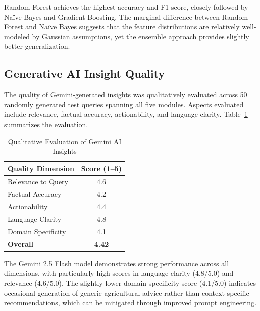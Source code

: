 Random Forest achieves the highest accuracy and F1-score, closely followed by Na\"ive Bayes and Gradient Boosting. The marginal difference between Random Forest and Na\"ive Bayes suggests that the feature distributions are relatively well-modeled by Gaussian assumptions, yet the ensemble approach provides slightly better generalization.

\subsection{Generative AI Insight Quality}
The quality of Gemini-generated insights was qualitatively evaluated across 50 randomly generated test queries spanning all five modules. Aspects evaluated include relevance, factual accuracy, actionability, and language clarity. Table~\ref{tab:gemini_eval} summarizes the evaluation.

\begin{table}[htbp]
\caption{Qualitative Evaluation of Gemini AI Insights}
\label{tab:gemini_eval}
\centering
\begin{tabular}{@{}lc@{}}
\toprule
\textbf{Quality Dimension} & \textbf{Score (1--5)} \\
\midrule
Relevance to Query & 4.6 \\
Factual Accuracy & 4.2 \\
Actionability & 4.4 \\
Language Clarity & 4.8 \\
Domain Specificity & 4.1 \\
\textbf{Overall} & \textbf{4.42} \\
\bottomrule
\end{tabular}
\end{table}

The Gemini 2.5 Flash model demonstrates strong performance across all dimensions, with particularly high scores in language clarity (4.8/5.0) and relevance (4.6/5.0). The slightly lower domain specificity score (4.1/5.0) indicates occasional generation of generic agricultural advice rather than context-specific recommendations, which can be mitigated through improved prompt engineering.
